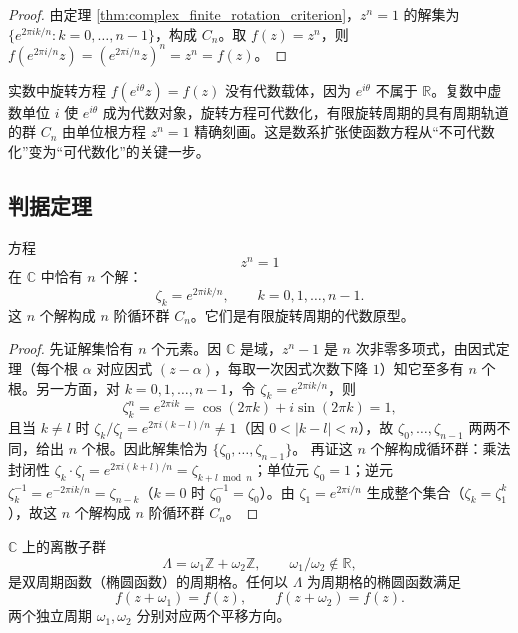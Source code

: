 \begin{proof}
由定理 \ref{thm:complex_finite_rotation_criterion}，$z^n=1$ 的解集为 $\{e^{2\pi ik/n}:k=0,\dots,n-1\}$，构成 $C_n$。取 $f(z)=z^n$，则 $f(e^{2\pi i/n}z)=(e^{2\pi i/n}z)^n=z^n=f(z)$。
\end{proof}

\begin{remark}\label{rem:complex_makes_rotation_algebraic}
实数中旋转方程 $f(e^{i\theta}z)=f(z)$ 没有代数载体，因为 $e^{i\theta}$ 不属于 $\mathbb{R}$。复数中虚数单位 $i$ 使 $e^{i\theta}$ 成为代数对象，旋转方程可代数化，有限旋转周期的具有周期轨道的群 $C_n$ 由单位根方程 $z^n=1$ 精确刻画。这是数系扩张使函数方程从“不可代数化”变为“可代数化”的关键一步。
\end{remark}
\subsection{\texorpdfstring{判据定理}{判据定理}}

\begin{theorem}[有限旋转周期的代数判据]\label{thm:complex_finite_rotation_criterion}
方程
\[
z^n = 1
\]
在 $\mathbb{C}$ 中恰有 $n$ 个解：
\[
\zeta_k = e^{2\pi i k/n},\qquad k = 0, 1, \dots, n-1.
\]
这 $n$ 个解构成 $n$ 阶循环群 $C_n$。它们是有限旋转周期的代数原型。
\end{theorem}

\begin{proof}
先证解集恰有 $n$ 个元素。因 $\mathbb{C}$ 是域，$z^n - 1$ 是 $n$ 次非零多项式，由因式定理（每个根 $\alpha$ 对应因式 $(z-\alpha)$，每取一次因式次数下降 $1$）知它至多有 $n$ 个根。另一方面，对 $k = 0, 1, \dots, n-1$，令 $\zeta_k = e^{2\pi i k/n}$，则
\[
\zeta_k^n = e^{2\pi i k} = \cos(2\pi k) + i\sin(2\pi k) = 1,
\]
且当 $k \neq l$ 时 $\zeta_k/\zeta_l = e^{2\pi i(k-l)/n} \neq 1$（因 $0 < |k-l| < n$），故 $\zeta_0, \dots, \zeta_{n-1}$ 两两不同，给出 $n$ 个根。因此解集恰为 $\{\zeta_0, \dots, \zeta_{n-1}\}$。
再证这 $n$ 个解构成循环群：乘法封闭性 $\zeta_k \cdot \zeta_l = e^{2\pi i(k+l)/n} = \zeta_{k+l \bmod n}$；单位元 $\zeta_0 = 1$；逆元 $\zeta_k^{-1} = e^{-2\pi i k/n} = \zeta_{n-k}$（$k = 0$ 时 $\zeta_0^{-1} = \zeta_0$）。由 $\zeta_1 = e^{2\pi i/n}$ 生成整个集合（$\zeta_k = \zeta_1^k$），故这 $n$ 个解构成 $n$ 阶循环群 $C_n$。
\end{proof}

\begin{theorem}[双周期结构的周期格判据]\label{thm:complex_double_period}
$\mathbb{C}$ 上的离散子群
\[
\Lambda = \omega_1 \mathbb{Z} + \omega_2 \mathbb{Z},\qquad \omega_1/\omega_2 \notin \mathbb{R},
\]
是双周期函数（椭圆函数）的周期格。任何以 $\Lambda$ 为周期格的椭圆函数满足
\[
f(z + \omega_1) = f(z), \qquad f(z + \omega_2) = f(z).
\]
两个独立周期 $\omega_1, \omega_2$ 分别对应两个平移方向。
\end{theorem}

